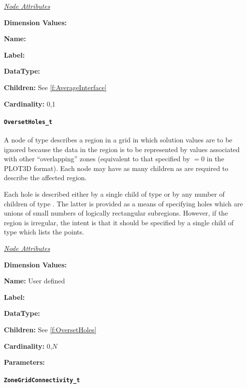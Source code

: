 \textit{\uline{Node Attributes}}
\begin{Ventryic}{\textbf{Dimension Values:}}
\item [\textbf{Name:}]
\item [\textbf{Label:}]
\item [\textbf{DataType:}]
\item [\textbf{Children:}]
      See \autoref{f:AverageInterface}
\item [\textbf{Cardinality:}]
      0,1
\end{Ventryic}

\paragraph{\texttt{OversetHoles\_t}}

A node of type  describes a region in a grid in
which solution values are to be ignored because the data in the region
is to be represented by values associated with other ``overlapping''
zones (equivalent to that specified by  $= 0$ in the PLOT3D
format). Each  node may have as many
 children as are required to describe the affected
region.

Each hole is described either by a single child of type  or
by any number of children of type . The latter is provided
as a means of specifying holes which are unions of small numbers of
logically rectangular subregions. However, if the region is irregular,
the intent is that it should be specified by a single child of type
 which lists the points.

\textit{\uline{Node Attributes}}
\begin{Ventryic}{\textbf{Dimension Values:}}
\item [\textbf{Name:}]
      User defined
\item [\textbf{Label:}]
\item [\textbf{DataType:}]
\item [\textbf{Children:}]
      See \autoref{f:OversetHoles}
\item [\textbf{Cardinality:}]
      0,$N$
\item [\textbf{Parameters:}]
\end{Ventryic}

\paragraph{\texttt{ZoneGridConnectivity\_t}}

